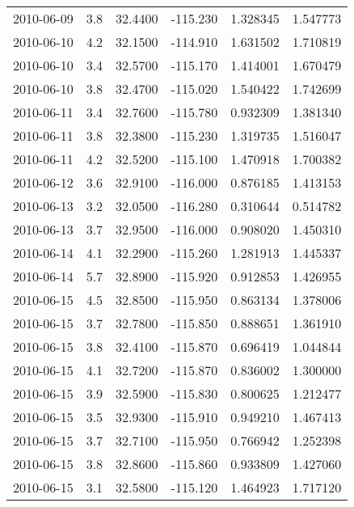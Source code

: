 \begin{tabular}{lrrrrr}
2010-06-09 &       3.8 &  32.4400 &  -115.230 &         1.328345 &         1.547773 \\
2010-06-10 &       4.2 &  32.1500 &  -114.910 &         1.631502 &         1.710819 \\
2010-06-10 &       3.4 &  32.5700 &  -115.170 &         1.414001 &         1.670479 \\
2010-06-10 &       3.8 &  32.4700 &  -115.020 &         1.540422 &         1.742699 \\
2010-06-11 &       3.4 &  32.7600 &  -115.780 &         0.932309 &         1.381340 \\
2010-06-11 &       3.8 &  32.3800 &  -115.230 &         1.319735 &         1.516047 \\
2010-06-11 &       4.2 &  32.5200 &  -115.100 &         1.470918 &         1.700382 \\
2010-06-12 &       3.6 &  32.9100 &  -116.000 &         0.876185 &         1.413153 \\
2010-06-13 &       3.2 &  32.0500 &  -116.280 &         0.310644 &         0.514782 \\
2010-06-13 &       3.7 &  32.9500 &  -116.000 &         0.908020 &         1.450310 \\
2010-06-14 &       4.1 &  32.2900 &  -115.260 &         1.281913 &         1.445337 \\
2010-06-14 &       5.7 &  32.8900 &  -115.920 &         0.912853 &         1.426955 \\
2010-06-15 &       4.5 &  32.8500 &  -115.950 &         0.863134 &         1.378006 \\
2010-06-15 &       3.7 &  32.7800 &  -115.850 &         0.888651 &         1.361910 \\
2010-06-15 &       3.8 &  32.4100 &  -115.870 &         0.696419 &         1.044844 \\
2010-06-15 &       4.1 &  32.7200 &  -115.870 &         0.836002 &         1.300000 \\
2010-06-15 &       3.9 &  32.5900 &  -115.830 &         0.800625 &         1.212477 \\
2010-06-15 &       3.5 &  32.9300 &  -115.910 &         0.949210 &         1.467413 \\
2010-06-15 &       3.7 &  32.7100 &  -115.950 &         0.766942 &         1.252398 \\
2010-06-15 &       3.8 &  32.8600 &  -115.860 &         0.933809 &         1.427060 \\
2010-06-15 &       3.1 &  32.5800 &  -115.120 &         1.464923 &         1.717120 \\

\end{tabular}
